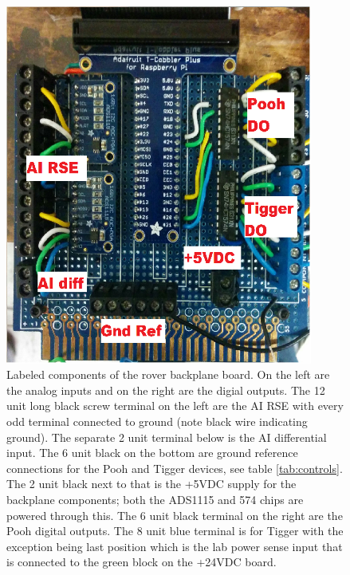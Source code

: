 \documentclass{article}
\begin{document}
\begin{figure}
\centering
\includegraphics[width=0.9\textwidth]{roverOverhead2.png}
\caption{Labeled components of the rover backplane board. On the left are the analog inputs and on the right are the digial outputs. The 12 unit long black screw terminal on the left are the AI RSE with every odd terminal connected to ground (note black wire indicating ground). The separate 2 unit terminal below is the AI differential input. The 6 unit black on the bottom are ground reference connections for the Pooh and Tigger devices, see table \ref{tab:controls}. The 2 unit black next to that is the +5VDC supply for the backplane components; both the ADS1115 and 574 chips are powered through this. The 6 unit black terminal on the right are the Pooh digital outputs. The 8 unit blue terminal is for Tigger with the exception being last position which is the lab power sense input that is connected to the green block on the +24VDC board.}
\label{fig:roverOverhead2}
\end{figure}
\end{document}
